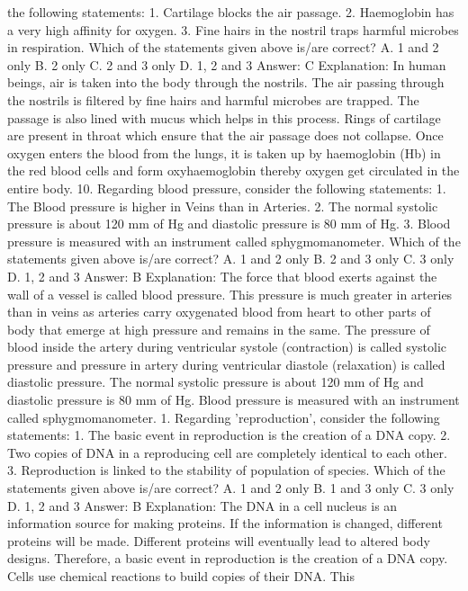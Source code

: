 the following statements:
1. Cartilage blocks the air passage.
2. Haemoglobin has a very high affinity for oxygen.
3. Fine hairs in the nostril traps harmful microbes in respiration.
Which of the statements given above is/are correct?
A. 1 and 2 only
B. 2 only
C. 2 and 3 only
D. 1, 2 and 3
Answer: C
Explanation: In human beings, air is taken into the body through
the nostrils. The air passing through the nostrils is filtered by fine
hairs and harmful microbes are trapped. The passage is also lined
with mucus which helps in this process.
Rings of cartilage are present in throat which ensure that the air
passage does not collapse.
Once oxygen enters the blood from the lungs, it is taken up by
haemoglobin (Hb) in the red blood cells and form oxyhaemoglobin
thereby oxygen get circulated in the entire body.
10. Regarding blood pressure, consider the following statements:
1. The Blood pressure is higher in Veins than in Arteries.
2. The normal systolic pressure is about 120 mm of Hg and diastolic
pressure is 80 mm of Hg.
3. Blood pressure is measured with an instrument called
sphygmomanometer.
Which of the statements given above is/are correct?
A. 1 and 2 only
B. 2 and 3 only
C. 3 only
D. 1, 2 and 3
Answer: B
Explanation: The force that blood exerts against the wall of a
vessel is called blood pressure. This pressure is much greater in
arteries than in veins as arteries carry oxygenated blood from heart
to other parts of body that emerge at high pressure and remains in
the same.
The pressure of blood inside the artery during ventricular systole
(contraction) is called systolic pressure and pressure in artery
during ventricular diastole (relaxation) is called diastolic pressure.
The normal systolic pressure is about 120 mm of Hg and diastolic
pressure is 80 mm of Hg. Blood pressure is measured with an
instrument called sphygmomanometer.
1. Regarding 'reproduction', consider the following statements:
1. The basic event in reproduction is the creation of a DNA copy.
2. Two copies of DNA in a reproducing cell are completely identical
to each other.
3. Reproduction is linked to the stability of population of species.
Which of the statements given above is/are correct?
A. 1 and 2 only
B. 1 and 3 only
C. 3 only
D. 1, 2 and 3
Answer: B
Explanation: The DNA in a cell nucleus is an information source for
making proteins. If the information is changed, different proteins
will be made. Different proteins will eventually lead to altered body
designs. Therefore, a basic event in reproduction is the creation of a
DNA copy.
Cells use chemical reactions to build copies of their DNA. This
